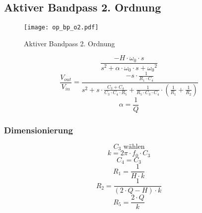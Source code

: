 



\subsection{Aktiver Bandpass 2. Ordnung}
\label{filt:o2-bp}
\begin{figure}[h!]
	\centering
	\texttt{[image: op\_bp\_o2.pdf]}
	\caption{Aktiver Bandpass 2. Ordnung}
	\label{sch:op-bp-o2}
\end{figure}
\[ \frac{- H \cdot \omega_0 \cdot s}
{s^2 + \alpha \cdot \omega_0 \cdot s  + {\omega_0}^2} \]
\[ \frac{V_{out}}{V_{in}} = \frac{- s \cdot \frac{1}{R_1 \cdot C_4}}
{s^2 + s \cdot \frac{C_3 + C_4}{C_3 \cdot C_4 \cdot R_5} + 
\frac{1}{R_5 \cdot C_3 \cdot C_4} \cdot 
\left(\frac{1}{R_1} + \frac{1}{R_2}\right)} \]
\[  \alpha = \frac{1}{Q}\]
\subsubsection{Dimensionierung}
\[ C_3 \text{ wählen} \]
\[ k = 2 \pi \cdot f_0 \cdot C_3 \]
\[ C_4 = C_3 \]
\[ R_1 = \frac{1}{H \cdot k} \]
\[ R_2 = \frac{1}{(2 \cdot Q - H) \cdot k} \]
\[ R_5 = \frac{2 \cdot Q}{k} \]
